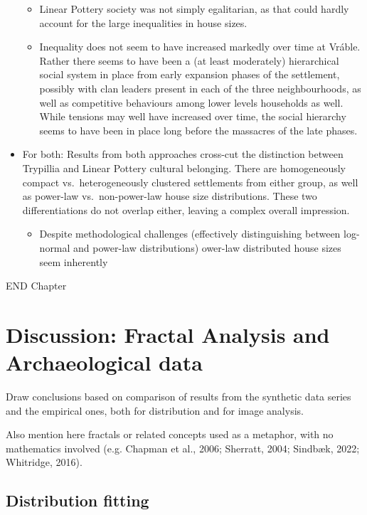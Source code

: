 \documentclass[
  12pt,
]{book}
\providecommand{\tightlist}{%
  \setlength{\itemsep}{0pt}\setlength{\parskip}{0pt}}
\begin{document}
\begin{itemize}
  \begin{itemize}
  \item
    Linear Pottery society was not simply egalitarian, as that could hardly account for the large inequalities in house sizes.
  \item
    Inequality does not seem to have increased markedly over time at Vráble. Rather there seems to have been a (at least moderately) hierarchical social system in place from early expansion phases of the settlement, possibly with clan leaders present in each of the three neighbourhoods, as well as competitive behaviours among lower levels households as well. While tensions may well have increased over time, the social hierarchy seems to have been in place long before the massacres of the late phases.
  \end{itemize}
\item
  For both: Results from both approaches cross-cut the distinction between Trypillia and Linear Pottery cultural belonging. There are homogeneously compact vs.~heterogeneously clustered settlements from either group, as well as power-law vs.~non-power-law house size distributions. These two differentiations do not overlap either, leaving a complex overall impression.

  \begin{itemize}
  \tightlist
  \item
    Despite methodological challenges (effectively distinguishing between log-normal and power-law distributions) ower-law distributed house sizes seem inherently
  \end{itemize}
\end{itemize}

END Chapter

\hypertarget{disc-methods}{%
\chapter{Discussion: Fractal Analysis and Archaeological data}\label{disc-methods}}

Draw conclusions based on comparison of results from the synthetic data series and the empirical ones, both for distribution and for image analysis.

Also mention here fractals or related concepts used as a metaphor, with no mathematics involved (e.g. Chapman et al., 2006; Sherratt, 2004; Sindbæk, 2022; Whitridge, 2016).

\hypertarget{distribution-fitting}{%
\section{Distribution fitting}\label{distribution-fitting}}
\end{document}

